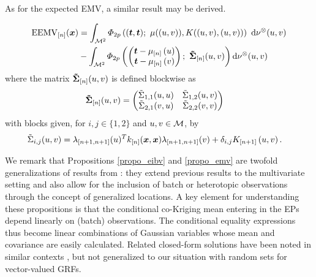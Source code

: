 \documentclass[aoas,preprint]{imsart}
\begin{document}
As for the expected EMV, a similar result may be derived.
\begin{propo}
\label{propo_emv}

\begin{equation*}
\begin{split}
\currentEEMV(\bm{x})
&=\int_{\domain^2} 
\varPhi_{2\no}
\left(
(\bt, \bt); ~ \mu((u,v)), 
K((u,v),(u,v))
\right) 
\
\mathrm{d}\mes^{\otimes} 
(u,v)\\
&-\int_{\domain^2} \varPhi_{2\no}
\left(
\left(
\begin{matrix}
\bt-\currentMean{\uu}\\
\bt-\currentMean{\vv}
\end{matrix}
\right);~
\mathbf{\tilde{\Sigma}}_{[\stage]}(\uu, \vv)
\right)
\mathrm{d}\mes^{\otimes} 
(u,v)
\end{split}
\end{equation*}
where the matrix $\mathbf{\tilde{\Sigma}}_{[n]}(u, v)$ is defined blockwise as
\begin{equation*}
\begin{split}
\mathbf{\tilde{\Sigma}}_{[n]}(\uu, \vv)&=
\left(
\begin{matrix}
\tilde{\Sigma}_{1,1}(\uu, \uu) & \tilde{\Sigma}_{1,2}(\uu, \vv)\\
\tilde{\Sigma}_{2,1}(\vv, \uu) & \tilde{\Sigma}_{2,2}(\vv, \vv)
\end{matrix}\right)
\end{split}
\end{equation*}
with blocks given, for $i,j\in \{1,2\}$ and $u,v\in \mathcal{M}$, by
\begin{equation*}
\begin{split}
\tilde{\Sigma}_{i,j}(u, v) &= \lambda_{[n+1,n+1]}(\uu)^T k_{[n]}(\bm{x},\bm{x}) \lambda_{[n+1,n+1]}(\vv) + \delta_{i,j}\futureCov{\uu, \vv}.
\end{split}
\end{equation*}
\end{propo}

We remark that Propositions \ref{propo_eibv} and \ref{propo_emv} are
twofold generalizations of results from \cite{chevalier2014fast}: they
extend previous results to the multivariate setting and also allow for
the inclusion of batch or heterotopic observations through the concept
of generalized locations.  A key element for understanding these
propositions is that the conditional co-Kriging mean entering in the
EPs depend linearly on (batch) observations. The conditional equality
expressions thus become linear combinations of Gaussian variables
whose mean and covariance are easily calculated.  Related closed-form
solutions have been noted in similar contexts
\citep{bhattacharjya2013value,stroh}, but not generalized to our
situation with random sets for vector-valued GRFs.
\end{document}
